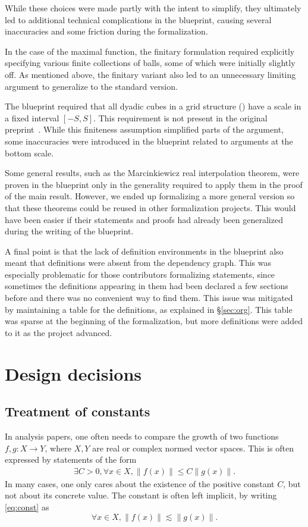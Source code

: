 \documentclass[12pt, reqno]{amsart}
\theoremstyle{definition}
\theoremstyle{plain}
\begin{document}
While these choices were made partly with the intent to simplify, they ultimately
led to additional technical complications in the blueprint, causing several inaccuracies
and some friction during the formalization.

In the case of the maximal function, the finitary formulation required explicitly specifying
various finite collections of balls, some of which were initially slightly off. As mentioned
above, the finitary variant also led to an unnecessary limiting argument to generalize
to the standard version.

The blueprint required that all dyadic cubes in a grid structure () have a scale in a fixed interval $[-S, S]$.
This requirement is not present in the original preprint~\cite{ThieleCarlesonPreprint}.
While this finiteness assumption simplified parts of the argument, some inaccuracies were introduced in the blueprint related to arguments at the bottom scale.

Some general results, such as the Marcinkiewicz real interpolation theorem, were proven in the blueprint only in the generality required to apply them in the proof of the main result. However, we ended up formalizing a more general version so that these theorems could be reused in other formalization projects. This would have been easier if their statements and proofs had already been generalized during the writing of the blueprint.

A final point is that the lack of definition environments in the blueprint also
meant that definitions were absent from the dependency graph. This was especially problematic for those contributors formalizing statements, since sometimes the definitions appearing in them had been declared a few sections before and there was no convenient way to find them. This issue was mitigated by maintaining a table for the definitions, as explained in \S\ref{sec:org}. This table was sparse at the beginning of the formalization, but more definitions were added to it as the project advanced.

\section{Design decisions}\label{sec:design}
\subsection{Treatment of constants}\label{subsec:constants}
In analysis papers, one often needs to compare the growth of two functions $f, g\colon X \to Y$, where $X, Y$ are real or complex normed vector spaces. This is often expressed by statements of the form
\begin{align}\label{eq:const}
	\exists C > 0, \forall x \in X, \| f (x) \| \le C\|g(x)\|.
\end{align}
In many cases, one only cares about the existence of the positive constant $C$, but not about its concrete value.
The constant is often left implicit, by writing \eqref{eq:const} as
\[ \forall x \in X, \| f (x) \| \lesssim \|g(x)\|.\]
\end{document}
